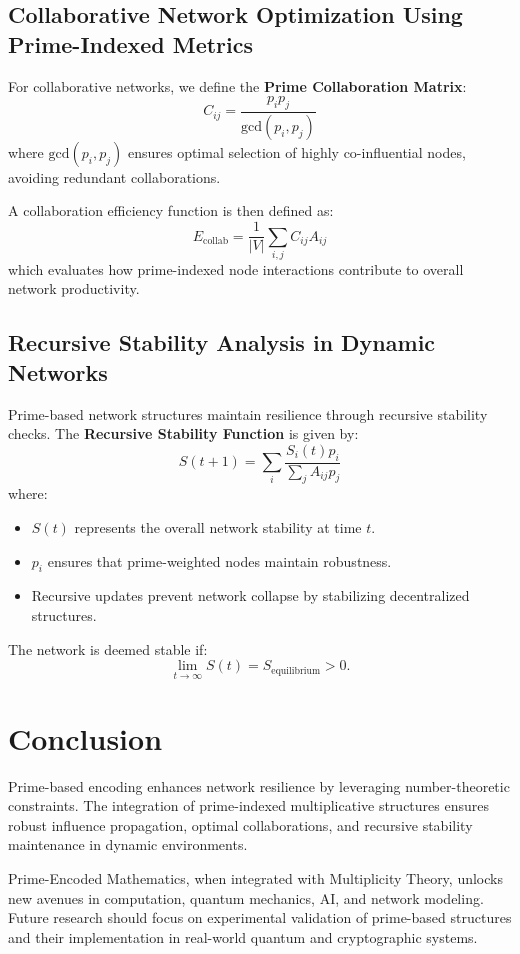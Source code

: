 \documentclass{article}
\begin{document}
\subsection{Collaborative Network Optimization Using Prime-Indexed Metrics}

For collaborative networks, we define the \textbf{Prime Collaboration Matrix}:
\begin{equation}
    C_{ij} = \frac{p_i p_j}{\text{gcd}(p_i, p_j)}
\end{equation}
where $\text{gcd}(p_i, p_j)$ ensures optimal selection of highly co-influential nodes, avoiding redundant collaborations.

A collaboration efficiency function is then defined as:
\begin{equation}
    E_{\text{collab}} = \frac{1}{|V|} \sum_{i,j} C_{ij} A_{ij}
\end{equation}
which evaluates how prime-indexed node interactions contribute to overall network productivity.

\subsection{Recursive Stability Analysis in Dynamic Networks}

Prime-based network structures maintain resilience through recursive stability checks. The \textbf{Recursive Stability Function} is given by:
\begin{equation}
    S(t+1) = \sum_{i} \frac{S_i(t) p_i}{\sum_{j} A_{ij} p_j}
\end{equation}
where:
\begin{itemize}
    \item $S(t)$ represents the overall network stability at time $t$.
    \item $p_i$ ensures that prime-weighted nodes maintain robustness.
    \item Recursive updates prevent network collapse by stabilizing decentralized structures.
\end{itemize}

The network is deemed stable if:
\begin{equation}
    \lim_{t \to \infty} S(t) = S_{\text{equilibrium}} > 0.
\end{equation}

\section{Conclusion}
Prime-based encoding enhances network resilience by leveraging number-theoretic constraints. The integration of prime-indexed multiplicative structures ensures robust influence propagation, optimal collaborations, and recursive stability maintenance in dynamic environments.

Prime-Encoded Mathematics, when integrated with Multiplicity Theory, unlocks new avenues in computation, quantum mechanics, AI, and network modeling. Future research should focus on experimental validation of prime-based structures and their implementation in real-world quantum and cryptographic systems.

\nocite{*}


\end{document}
